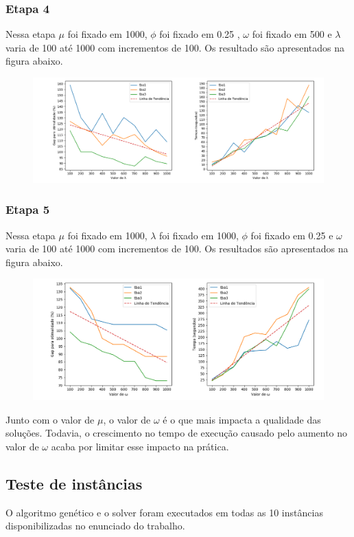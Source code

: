 \documentclass{article}
\begin{document}
\subsubsection{Etapa 4}
Nessa etapa $\mu$ foi fixado em 1000, $\phi$ foi fixado em 0.25 , $\omega$ foi fixado em 500 e $\lambda$ varia de 100 até 1000 com incrementos de 100. Os resultado são apresentados na figura abaixo.
\begin{figure}[H]
\centering
\includegraphics[scale=0.35]{lambda}
\end{figure}

\subsubsection{Etapa 5}
Nessa etapa $\mu$ foi fixado em 1000, $\lambda$ foi fixado em 1000, $\phi$ foi fixado em 0.25 e $\omega$ varia de 100 até 1000 com incrementos de 100. Os resultados são apresentados na figura abaixo.
\begin{figure}[H]
\centering
\includegraphics[scale=0.35]{omega}
\end{figure}
Junto com o valor de $\mu$, o valor de $\omega$ é o que mais impacta a qualidade das soluções. Todavia, o crescimento no tempo de execução causado pelo aumento no valor de $\omega$ acaba por limitar  esse impacto na prática.

\subsection{Teste de instâncias}
O algoritmo genético e o solver foram executados em todas as 10 instâncias disponibilizadas no enunciado do trabalho.
\end{document}
